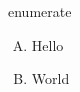 \documentclass[AutoFakeBold,AutoFakeSlant]{ctexart}
\begin{document}
\begin{latexbox}{enumerate}
\begin{enumerate}[A.]
    \item Hello
    \item World
\end{enumerate}
\end{latexbox}
\end{document}
